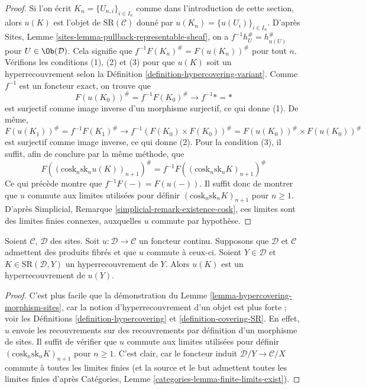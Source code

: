 \begin{proof}
Si l'on écrit $K_n = \{U_{n, i}\}_{i \in I_n}$ comme dans l'introduction
de cette section, alors $u(K)$ est l'objet de $\text{SR}(\mathcal{C})$
donné par $u(K_n) = \{u(U_i)\}_{i \in I_n}$.
D'après Sites, Lemme \ref{sites-lemma-pullback-representable-sheaf},
on a $f^{-1}h_U^\# = h_{u(U)}^\#$ pour $U \in \Ob(\mathcal{D})$.
Cela signifie que $f^{-1}F(K_n)^\# = F(u(K_n))^\#$ pour tout $n$.
Vérifions les conditions (1), (2) et (3) pour que $u(K)$ soit un
hyperrecouvrement selon la Définition \ref{definition-hypercovering-variant}.
Comme $f^{-1}$ est un foncteur exact, on trouve que
$$
F(u(K_0))^\# = f^{-1}F(K_0)^\# \to f^{-1}* = *
$$
est surjectif comme image inverse d'un morphisme surjectif, ce qui donne (1).
De même,
$$
F(u(K_1))^\# = f^{-1}F(K_1)^\# \to
f^{-1} (F(K_0) \times F(K_0))^\# = F(u(K_0))^\# \times F(u(K_0))^\#
$$
est surjectif comme image inverse, ce qui donne (2). Pour la condition (3),
il suffit, afin de conclure par la même méthode, que
$$
F((\text{cosk}_n \text{sk}_n u(K))_{n + 1})^\# =
f^{-1}F((\text{cosk}_n \text{sk}_n K)_{n + 1})^\#
$$
Ce qui précède montre que $f^{-1}F(-) = F(u(-))$. Il suffit donc de montrer
que $u$ commute aux limites utilisées pour définir
$(\text{cosk}_n \text{sk}_n K)_{n + 1}$ pour $n \geq 1$.
D'après Simplicial, Remarque \ref{simplicial-remark-existence-cosk},
ces limites sont des limites finies connexes, auxquelles $u$ commute
par hypothèse.
\end{proof}

\begin{lemma}
\label{lemma-hypercovering-continuous-functor}
Soient $\mathcal{C}$, $\mathcal{D}$ des sites. Soit
$u : \mathcal{D} \to \mathcal{C}$ un foncteur continu.
Supposons que $\mathcal{D}$ et $\mathcal{C}$ admettent des produits fibrés
et que $u$ commute à ceux-ci. Soient $Y \in \mathcal{D}$ et
$K \in \text{SR}(\mathcal{D}, Y)$ un hyperrecouvrement de $Y$.
Alors $u(K)$ est un hyperrecouvrement de $u(Y)$.
\end{lemma}

\begin{proof}
C'est plus facile que la démonstration du Lemme \ref{lemma-hypercovering-morphism-sites},
car la notion d'hyperrecouvrement d'un objet est plus forte ; voir les
Définitions \ref{definition-hypercovering} et \ref{definition-covering-SR}.
En effet, $u$ envoie les recouvrements sur des recouvrements par définition
d'un morphisme de sites. Il suffit de vérifier que $u$ commute aux
limites utilisées pour définir
$(\text{cosk}_n \text{sk}_n K)_{n + 1}$ pour $n \geq 1$.
C'est clair, car le foncteur induit
$\mathcal{D}/Y \to \mathcal{C}/X$ commute à toutes les limites finies
(et la source et le but admettent toutes les limites finies d'après
Catégories, Lemme \ref{categories-lemma-finite-limits-exist}).
\end{proof}

